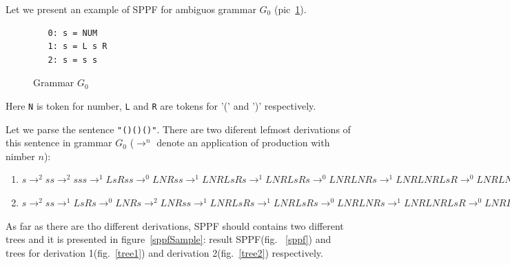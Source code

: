Let we present an example of SPPF for ambiguos grammar $G_0$ (pic~\ref{grammarG0}).

\begin{figure}[h]
   \begin{center}
\begin{verbatim}
   0: s = NUM
   1: s = L s R
   2: s = s s
\end{verbatim}
   \caption{Grammar $G_0$}
   \label{grammarG0}        
   \end{center}
\end{figure}

Here \verb|N| is token for number, \verb|L| and \verb|R| are tokens for '(' and ')'  respectively.

Let we parse the sentence \verb|"()()()"|. 
There are two diferent lefmost derivations of this sentence in grammar $G_0$ ($\rightarrow ^ n$ denote an application of production with nimber $n$): 
\begin{enumerate} 
    \item $s \rightarrow ^ 2 s s \rightarrow ^ 2 s s s \rightarrow ^ 1 L s R s s \rightarrow ^ 0 L N R s s \rightarrow ^ 1 
    L N R L s R s \rightarrow ^ 1 L N R L s R s \rightarrow ^ 0 L N R L N R s \rightarrow ^ 1 L N R L N R L s R \rightarrow ^ 0 L N R L N R L N R$
    \item $s \rightarrow ^ 2 s s \rightarrow ^ 1 L s R s  \rightarrow ^ 0 L N R s \rightarrow ^ 2 L N R s s  \rightarrow ^ 1 
    L N R L s R s \rightarrow ^ 1 L N R L s R s \rightarrow ^ 0 L N R L N R s \rightarrow ^ 1 L N R L N R L s R \rightarrow ^ 0 L N R L N R L N R$
\end{enumerate}
 
    As far as there are tho different derivations, SPPF should contains two different trees and it is presented in figure~\ref{sppfSample}: result SPPF(fig. ~\ref{sppf}) and trees for derivation 1(fig.~\ref{tree1}) and derivation 2(fig.~\ref{tree2}) respectively. 
 
